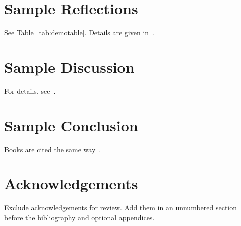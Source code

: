 \documentclass{article}
\begin{document}
\section{Sample Reflections}

See Table~\ref{tab:demotable}. \lipsum[5] Details are given in~.

\section{Sample Discussion}

\lipsum[6] For details, see~.

\section{Sample Conclusion}
\lipsum[7] Books are cited the same way~\cite{aoett}.

\section*{Acknowledgements}
Exclude acknowledgements for review. Add them in an unnumbered section before the bibliography and optional appendices.



\end{document}
